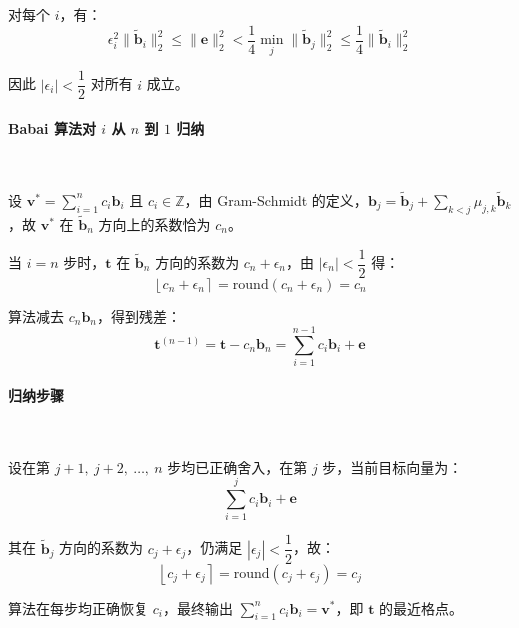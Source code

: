 \documentclass{article}
\begin{document}
对每个 $i$，有：
\[ \epsilon_i^2 \|\tilde{\bm{b}}_i\|_2^2\leqslant\|\bm{e}\|_2^2< \frac{1}{4}\min_j\|\tilde{\bm{b}}_j\|_2^2\leqslant\frac{1}{4}\|\tilde{\bm{b}}_i\|_2^2 \]

因此 $|\epsilon_i| < \dfrac{1}{2}$ 对所有 $i$ 成立。



\paragraph*{Babai 算法对 $i$ 从 $n$ 到 $1$ 归纳}~{}

设 $\bm{v}^* = \displaystyle\sum_{i=1}^n c_i \bm{b}_i$ 且 $c_i \in \mathbb{Z}$，由 Gram-Schmidt 的定义，$\bm{b}_j = \tilde{\bm{b}}_j + \displaystyle\sum_{k<j}\mu_{j,k}\tilde{\bm{b}}_k$，故 $\bm{v}^*$ 在 $\tilde{\bm{b}}_n$ 方向上的系数恰为 $c_n$。

当 $i=n$ 步时，$\bm{t}$ 在 $\tilde{\bm{b}}_n$ 方向的系数为 $c_n + \epsilon_n$，由 $|\epsilon_n| < \dfrac{1}{2}$ 得：
\[ \left\lfloor c_n+\epsilon_n\right\rceil=\mathrm{round}(c_n + \epsilon_n) = c_n  \]

算法减去 $c_n \bm{b}_n$，得到残差：
\[ \bm{t}^{(n-1)} = \bm{t} - c_n\bm{b}_n = \sum_{i=1}^{n-1}c_i\bm{b}_i + \bm{e} \]



\paragraph*{归纳步骤}~{}

设在第 $j+1,\ j+2,\ \ldots,\ n$ 步均已正确舍入，在第 $j$ 步，当前目标向量为：
\[ \sum_{i=1}^{j}c_i\bm{b}_i + \bm{e} \]

其在 $\tilde{\bm{b}}_j$ 方向的系数为 $c_j + \epsilon_j$，仍满足 $|\epsilon_j| < \dfrac{1}{2}$，故：
\[ \left\lfloor c_j + \epsilon_j \right\rceil=\mathrm{round}(c_j + \epsilon_j) = c_j \]

算法在每步均正确恢复 $c_i$，最终输出 $\displaystyle\sum_{i=1}^n c_i\bm{b}_i = \bm{v}^* $，即 $\bm{t}$ 的最近格点。
\end{document}
